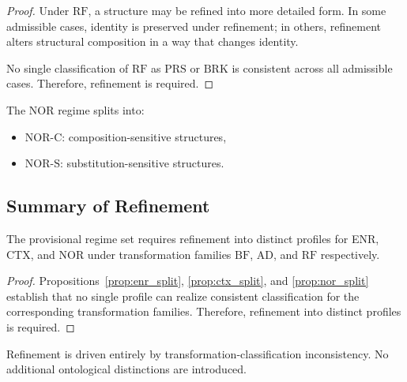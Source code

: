 \begin{proof}
Under $\mathrm{RF}$, a structure may be refined into more detailed form.
In some admissible cases, identity is preserved under refinement;
in others, refinement alters structural composition in a way
that changes identity.

No single classification of $\mathrm{RF}$ as $\mathrm{PRS}$ or $\mathrm{BRK}$
is consistent across all admissible cases.
Therefore, refinement is required.
\end{proof}

\begin{definition}
\label{def:nor_refinement}
The NOR regime splits into:
\begin{itemize}
\item $\mathrm{NOR\mbox{-}C}$: composition-sensitive structures,
\item $\mathrm{NOR\mbox{-}S}$: substitution-sensitive structures.
\end{itemize}
\end{definition}

\subsection{Summary of Refinement}

\begin{theorem}
\label{thm:refinement_result}
The provisional regime set requires refinement into distinct profiles
for ENR, CTX, and NOR under transformation families
$\mathrm{BF}$, $\mathrm{AD}$, and $\mathrm{RF}$ respectively.
\end{theorem}

\begin{proof}
Propositions~\ref{prop:enr_split}, \ref{prop:ctx_split},
and \ref{prop:nor_split} establish that no single profile
can realize consistent classification for the corresponding
transformation families.
Therefore, refinement into distinct profiles is required.
\end{proof}


Refinement is driven entirely by transformation-classification inconsistency.
No additional ontological distinctions are introduced.


